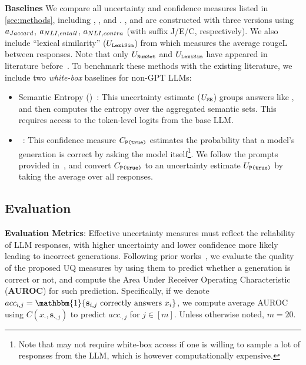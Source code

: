 \textbf{Baselines}
We compare all uncertainty and confidence measures listed in \cref{sec:methods}, including \baselineNumSets, \methodDegree, \methodEcc and \methodEigvClip.
\methodDegree, \methodEcc and \methodEigvClip are constructed with three versions using $a_{Jaccard}$, $a_{NLI,entail}$, $a_{NLI,contra}$ (with suffix J/E/C, respectively).
We also include ``lexical similarity'' ($U_\texttt{LexiSim}$) from \citet{kuhn2023semantic} which measures the average rougeL between responses.
Note that only $U_{\texttt{NumSet}}$ and $U_{\texttt{LexiSim}}$ have appeared in literature before~\citep{kuhn2023semantic}.
To benchmark these methods with the existing literature, we include two \textit{white-box} baselines for non-GPT LLMs: 
\begin{itemize}
    \item Semantic Entropy (\baselineGal)~\citep{kuhn2023semantic}:
    This uncertainty estimate ($U_{\texttt{SE}}$) groups answers like \baselineNumSets, and then computes the entropy over the aggregated semantic sets.
    This requires access to the token-level logits from the base LLM.
    \item \baselinePTrue~\citep{kadavath2022language}:
    This confidence measure $C_{\texttt{P(true)}}$ estimates the probability that a model's generation is correct by asking the model itself\footnote{Note that \baselinePTrue may not require white-box access if one is willing to sample a lot of responses from the LLM, which is however computationally expensive.}.
    We follow the prompts provided in~\cite{kuhn2023semantic,kadavath2022language}, and convert $C_{\texttt{P(true)}}$ to an uncertainty estimate $U_{\texttt{P(true)}}$ by taking the average over all responses.
    
\end{itemize}


\subsection{Evaluation}\label{sec:exp:eval}

\textbf{Evaluation Metrics}: 
Effective uncertainty measures must reflect the reliability of LLM responses, with higher uncertainty and lower confidence more likely leading to incorrect generations.
Following prior works~\citep{kuhn2023semantic,Band2022BenchmarkingBD}, we evaluate the quality of the proposed UQ measures by using them to predict whether a generation is correct or not, and compute the Area Under Receiver Operating Characteristic (\textbf{AUROC}) for such prediction.
Specifically, if we denote $acc_{i,j}=\mathbbm{1}\{\mathbf{s}_{i,j} \text{ correctly answers } x_i\}$, we compute average AUROC using $C(x_\cdot, \mathbf{s}_{\cdot,j})$ to predict $acc_{\cdot, j}$ for $j\in[m]$.
Unless otherwise noted, $m=20$.

